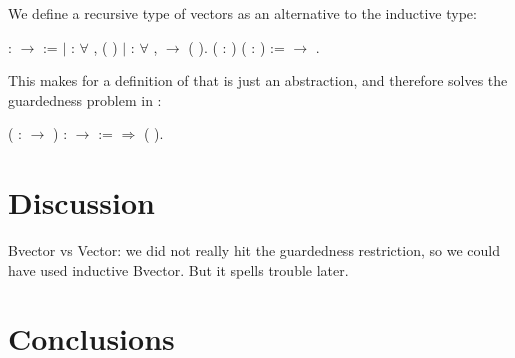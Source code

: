 We define a recursive type of vectors as an alternative to the inductive type:
\begin{singlespace}
\begin{coqdoccode}
\coqdocnoindent
{}  :
\ensuremath{\rightarrow}  :=\coqdoceol
\coqdocindent{1.00em}
\ensuremath{|}  :
\ensuremath{\forall} , 
(
)\coqdoceol
\coqdocindent{1.00em}
\ensuremath{|}   :
\ensuremath{\forall} , 
 \ensuremath{\rightarrow}
(
).\coqdoceol
\coqdocemptyline
\coqdocnoindent
{}
 ( :
) ( :
)
:=  
\ensuremath{\rightarrow} .\coqdoceol
\end{coqdoccode}
\end{singlespace}
This makes for a definition of 
that is just an abstraction, and therefore solves the guardedness problem in
:
\begin{singlespace}
\begin{coqdoccode}
\coqdocnoindent
{} 
  ( :
 \ensuremath{\rightarrow} ) 
:  
 \ensuremath{\rightarrow}
 
 :=\coqdoceol
\coqdocindent{1.00em}
   \ensuremath{\Rightarrow}
 ( ).\coqdoceol
\end{coqdoccode}
\end{singlespace}


\section{Discussion}

Bvector vs Vector: we did not really hit the guardedness restriction, so we
could have used inductive Bvector. But it spells trouble later.


\section{Conclusions}
